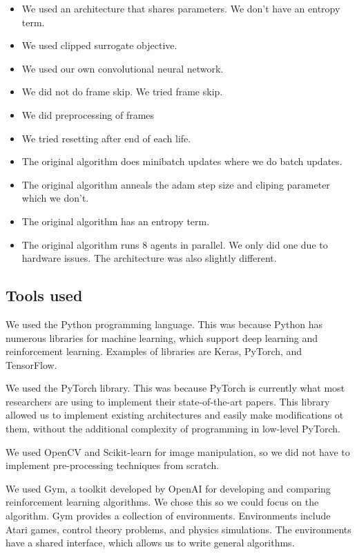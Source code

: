\documentclass[12pt,a4paper]{article}
\begin{document}
\begin{itemize}
    \item We used an architecture that shares parameters. We don't have an entropy term.
    \item We used clipped surrogate objective.
    \item We used our own convolutional neural network.
    \item We did not do frame skip. We tried frame skip.
    \item We did preprocessing of frames
    \item We tried resetting after end of each life. 
    \item The original algorithm does minibatch updates where we do batch updates.
    \item The original algorithm anneals the adam step size and cliping parameter which we don't.
    \item The original algorithm has an entropy term.
    \item The original algorithm runs 8 agents in parallel. We only did one due to hardware issues. The architecture was also slightly different.  
\end{itemize}

\subsection{Tools used}
We used the Python programming language. This was because Python has numerous libraries for machine learning, which support deep learning and reinforcement learning. Examples of libraries are Keras, PyTorch, and TensorFlow.

We used the PyTorch library. This was because PyTorch is currently what most researchers are using to implement their state-of-the-art papers. This library allowed us to implement existing architectures and easily make modifications ot them, without the additional complexity of programming in low-level PyTorch.

We used OpenCV and Scikit-learn for image manipulation, so we did not have to implement pre-processing techniques from scratch.

We used Gym, a toolkit developed by OpenAI for developing and comparing reinforcement learning algorithms. We chose this so we could focus on the algorithm. Gym provides a collection of environments. Environments include Atari games, control theory problems, and physics simulations. The environments have a shared interface, which allows us to write general algorithms.
\end{document}
